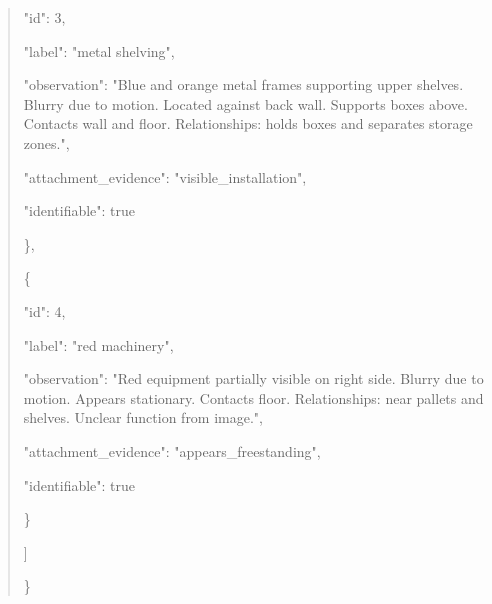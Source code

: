 \documentclass[10pt,a4paper]{article}
\begin{document}
\begin{quote}
      "id":\allowbreak{} 3,\allowbreak{}\par
      "label":\allowbreak{} "metal shelving",\allowbreak{}\par
      "observation":\allowbreak{} "Blue and orange metal frames supporting upper shelves. Blurry due to motion. Located against back wall. Supports boxes above. Contacts wall and floor. Relationships:\allowbreak{} holds boxes and separates storage zones.",\allowbreak{}\par
      "attachment\_evidence":\allowbreak{} "visible\_installation",\allowbreak{}\par
      "identifiable":\allowbreak{} true\par
    \},\allowbreak{}\par
    \{\par
      "id":\allowbreak{} 4,\allowbreak{}\par
      "label":\allowbreak{} "red machinery",\allowbreak{}\par
      "observation":\allowbreak{} "Red equipment partially visible on right side. Blurry due to motion. Appears stationary. Contacts floor. Relationships:\allowbreak{} near pallets and shelves. Unclear function from image.",\allowbreak{}\par
      "attachment\_evidence":\allowbreak{} "appears\_freestanding",\allowbreak{}\par
      "identifiable":\allowbreak{} true\par
    \}\par
  ]\par
\}
\end{quote}
\end{document}
